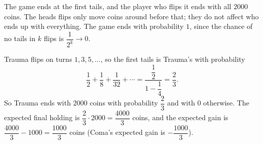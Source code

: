 The game ends at the first tails, and the player who flips it ends with all $2000$ coins. The heads flips only move coins around before that; they do not affect who ends up with everything. The game ends with probability $1$, since the chance of no tails in $k$ flips is $\dfrac{1}{2^k}\to0$.

Trauma flips on turns $1,3,5,\dots$, so the first tails is Trauma's with probability
\[
\dfrac{1}{2}+\dfrac{1}{8}+\dfrac{1}{32}+\cdots=\dfrac{\dfrac{1}{2}}{1-\dfrac{1}{4}}=\dfrac{2}{3} .
\]
So Trauma ends with $2000$ coins with probability $\dfrac{2}{3}$ and with $0$ otherwise. The expected final holding is $\dfrac{2}{3}\cdot2000=\boxed{\dfrac{4000}{3}}$ coins, and the expected gain is $\dfrac{4000}{3}-1000=\boxed{\dfrac{1000}{3}}$ coins (Coma's expected gain is $-\dfrac{1000}{3}$).
